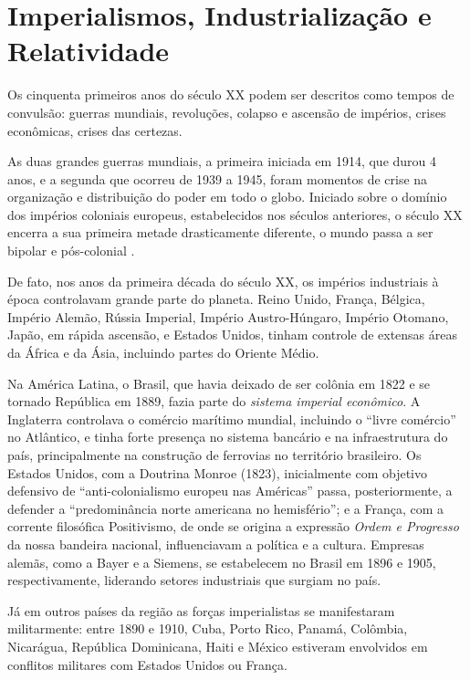 \documentclass{hipatia}
\begin{document}
\section{Imperialismos, Industrialização e Relatividade}

Os cinquenta primeiros anos do século XX podem ser descritos como tempos de convulsão: guerras mundiais, revoluções, colapso e ascensão de impérios, crises econômicas, crises das certezas.

	As duas grandes guerras mundiais, a primeira iniciada em 1914, que durou 4 anos, e a segunda que ocorreu de 1939 a 1945, foram momentos de crise na organização e distribuição do poder em todo o globo. Iniciado sobre o domínio dos impérios coloniais europeus, estabelecidos nos séculos anteriores, o século XX encerra a sua primeira metade drasticamente diferente, o mundo passa a ser bipolar e pós-colonial \cite{Keegan1998,Hobsbawm1988,Hobsbawm1995}.

	De fato, nos anos da primeira década do século XX, os impérios industriais à época controlavam grande parte do planeta. Reino Unido, França, Bélgica, Império Alemão, Rússia Imperial, Império Austro-Húngaro, Império Otomano, Japão, em rápida ascensão, e Estados Unidos, tinham controle de extensas áreas da África e da Ásia, incluindo partes do Oriente Médio.

	Na América Latina, o Brasil, que havia deixado de ser colônia em 1822 e se tornado República em 1889, fazia parte do \textit{sistema imperial econômico}. A Inglaterra controlava o comércio marítimo mundial, incluindo o ``livre comércio'' no Atlântico, e tinha forte presença no sistema bancário e na infraestrutura do país, principalmente na construção de ferrovias no território brasileiro. Os Estados Unidos, com a Doutrina Monroe (1823), inicialmente com objetivo defensivo de ``anti-colonialismo europeu nas Américas'' passa, posteriormente, a defender a ``predominância norte americana no hemisfério''; e a França, com a corrente filosófica Positivismo, de onde se origina a expressão \textit{Ordem e Progresso} da nossa bandeira nacional, influenciavam a política e a cultura. Empresas alemãs, como a Bayer e a Siemens, se estabelecem no Brasil em 1896 e 1905, respectivamente, liderando setores industriais que surgiam no país. 

Já em outros países da região as forças imperialistas se manifestaram militarmente: entre 1890 e 1910, Cuba, Porto Rico, Panamá, Colômbia, Nicarágua, República Dominicana, Haiti e México estiveram envolvidos em conflitos militares com Estados Unidos ou França.
\end{document}
